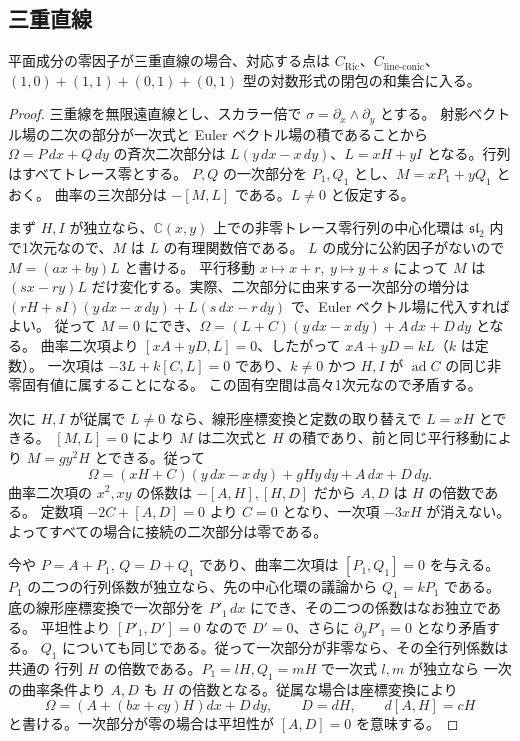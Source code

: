\subsection{三重直線}
\begin{proposition}\label{p12:prop:triple-cubic}
平面成分の零因子が三重直線の場合、対応する点は
$C_{\mathrm{Ric}}$、$C_{\mathrm{line\text{-}conic}}$、
$(1,0)+(1,1)+(0,1)+(0,1)$ 型の対数形式の閉包の和集合に入る。
\end{proposition}
\begin{proof}
三重線を無限遠直線とし、スカラー倍で $\sigma=\partial_x\wedge\partial_y$ とする。
射影ベクトル場の二次の部分が一次式と Euler ベクトル場の積であることから
$\Omega=P\,dx+Q\,dy$ の斉次二次部分は
$L(y\,dx-x\,dy)$、$L=xH+yI$ となる。行列はすべてトレース零とする。
$P,Q$ の一次部分を $P_1,Q_1$ とし、$M=xP_1+yQ_1$ とおく。
曲率の三次部分は $-[M,L]$ である。$L\ne0$ と仮定する。

まず $H,I$ が独立なら、$\mathbb C(x,y)$ 上での非零トレース零行列の中心化環は
$\mathfrak{sl}_2$ 内で1次元なので、$M$ は $L$ の有理関数倍である。
$L$ の成分に公約因子がないので $M=(a x+b y)L$ と書ける。
平行移動 $x\mapsto x+r,\ y\mapsto y+s$ によって $M$ は
$(s x-r y)L$ だけ変化する。実際、二次部分に由来する一次部分の増分は
$(rH+sI)(y\,dx-x\,dy)+L(s\,dx-r\,dy)$ で、Euler ベクトル場に代入すればよい。
従って $M=0$ にでき、$\Omega=(L+C)(y\,dx-x\,dy)+A\,dx+D\,dy$ となる。
曲率二次項より $[xA+yD,L]=0$、したがって $xA+yD=kL$（$k$ は定数）。
一次項は $-3L+k[C,L]=0$ であり、$k\ne0$ かつ $H,I$ が
$\operatorname{ad}C$ の同じ非零固有値に属することになる。
この固有空間は高々1次元なので矛盾する。

次に $H,I$ が従属で $L\ne0$ なら、線形座標変換と定数の取り替えで $L=xH$ とできる。
$[M,L]=0$ により $M$ は二次式と $H$ の積であり、前と同じ平行移動により
$M=g y^2 H$ とできる。従って
\[
 \Omega=(xH+C)(y\,dx-x\,dy)+gHy\,dy+A\,dx+D\,dy .
\]
曲率二次項の $x^2,xy$ の係数は $-[A,H],[H,D]$ だから $A,D$ は $H$ の倍数である。
定数項 $-2C+[A,D]=0$ より $C=0$ となり、一次項 $-3xH$ が消えない。
よってすべての場合に接続の二次部分は零である。

今や $P=A+P_1$, $Q=D+Q_1$ であり、曲率二次項は $[P_1,Q_1]=0$ を与える。
$P_1$ の二つの行列係数が独立なら、先の中心化環の議論から $Q_1=kP_1$ である。
底の線形座標変換で一次部分を $P'_1\,dx$ にでき、その二つの係数はなお独立である。
平坦性より $[P'_1,D']=0$ なので $D'=0$、さらに $\partial_yP'_1=0$ となり矛盾する。
$Q_1$ についても同じである。従って一次部分が非零なら、その全行列係数は共通の
行列 $H$ の倍数である。$P_1=lH,Q_1=mH$ で一次式 $l,m$ が独立なら
一次の曲率条件より $A,D$ も $H$ の倍数となる。従属な場合は座標変換により
\[
 \Omega=(A+(bx+cy)H)dx+D\,dy,\qquad
 D=dH,\qquad d[A,H]=cH
\]
と書ける。一次部分が零の場合は平坦性が $[A,D]=0$ を意味する。


\end{proof}
